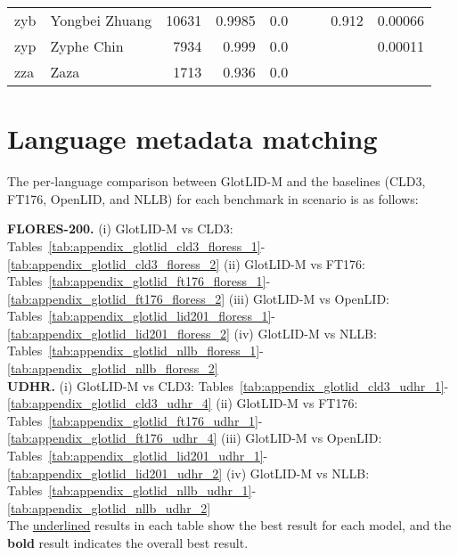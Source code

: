 \documentclass[11pt]{article}
\def\modelname{\mbox{GlotLID-M}\xspace}
\def\corpusname{\mbox{GlotLID-C}\xspace}
\def\flores{FLORES\xspace}
\def\udhr{UDHR\xspace}
\def\ft176{FT176\xspace}
\def\edin{OpenLID\xspace}
\def\nllb{NLLB\xspace}
\def\seclabel#1{\label{sec:#1}\label{p:#1}}
\begin{document}
\begin{table*}[h]
{\begin{tabular}{llrrrrrrr}
zyb         & Yongbei Zhuang         & 10631         & 0.9985         & 0.0         &          &          & 0.912         & 0.00066         \\

zyp         & Zyphe Chin         & 7934         & 0.999         & 0.0         &          &          &          & 0.00011         \\

zza         & Zaza         & 1713         & 0.936         & 0.0         &          &          &          &    \\
\end{tabular}
    }
    \caption{Performance of \modelname on \corpusname test, \flores-200 and \udhr benchmarks (part 25)}\label{tab:appendix_glot_per_lang_25}\end{table*} 

\section{Language metadata matching}\seclabel{metadata-match}

The per-language comparison between \modelname and the
baselines (CLD3, \ft176, \edin, and \nllb) for each
benchmark in scenario  is as follows:

\textbf{FLORES-200.}
    (i) \modelname vs CLD3: Tables~\ref{tab:appendix_glotlid_cld3_floress_1}-\ref{tab:appendix_glotlid_cld3_floress_2}
    (ii) \modelname vs \ft176: Tables~\ref{tab:appendix_glotlid_ft176_floress_1}-
\ref{tab:appendix_glotlid_ft176_floress_2}
    (iii) \modelname vs \edin: Tables~\ref{tab:appendix_glotlid_lid201_floress_1}-\ref{tab:appendix_glotlid_lid201_floress_2}
    (iv)  \modelname vs \nllb:  Tables~\ref{tab:appendix_glotlid_nllb_floress_1}-\ref{tab:appendix_glotlid_nllb_floress_2}\\

\textbf{UDHR.}
    (i) \modelname vs CLD3: Tables~\ref{tab:appendix_glotlid_cld3_udhr_1}-\ref{tab:appendix_glotlid_cld3_udhr_4}
    (ii) \modelname vs \ft176: Tables~\ref{tab:appendix_glotlid_ft176_udhr_1}-\ref{tab:appendix_glotlid_ft176_udhr_4}
    (iii) \modelname vs \edin: Tables~\ref{tab:appendix_glotlid_lid201_udhr_1}-\ref{tab:appendix_glotlid_lid201_udhr_2}
    (iv)  \modelname vs \nllb: Tables~\ref{tab:appendix_glotlid_nllb_udhr_1}-\ref{tab:appendix_glotlid_nllb_udhr_2}\\

The \underline{underlined} results in each table show the best result for each model, and the \textbf{bold} result indicates the overall best result.
\end{document}
